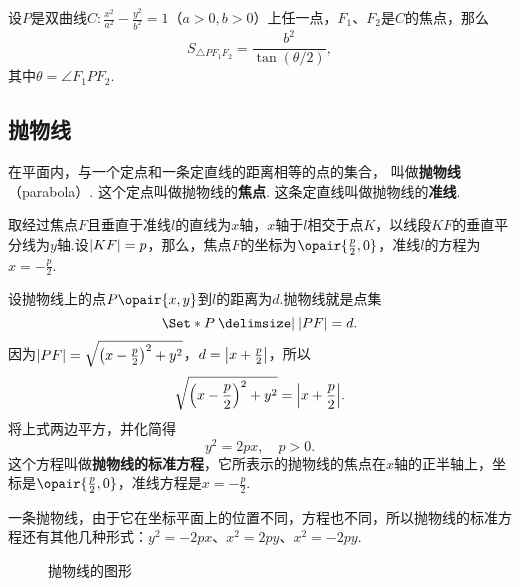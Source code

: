 \begin{theorem}[双曲线的焦点三角形]
设\(P\)是双曲线\(C: \frac{x^2}{a^2} - \frac{y^2}{b^2} = 1\)（\(a>0,b>0\)）上任一点，\(F_1\)、\(F_2\)是\(C\)的焦点，那么\[
S_{\triangle P F_1 F_2} = \frac{b^2}{\tan(\theta/2)},
\]其中\(\theta=\angle{F_1 P F_2}\).
\end{theorem}

\subsection{抛物线}
\begin{definition}
在平面内，与一个定点和一条定直线的距离相等的点的集合，%
叫做\textbf{抛物线}（parabola）.
这个定点叫做抛物线的\textbf{焦点}.
这条定直线叫做抛物线的\textbf{准线}.
\end{definition}

取经过焦点\(F\)且垂直于准线\(l\)的直线为\(x\)轴，\(x\)轴于\(l\)相交于点\(K\)，以线段\(KF\)的垂直平分线为\(y\)轴.设\(\abs{KF}=p\)，那么，焦点\(F\)的坐标为\(\opair{\frac{p}{2},0}\)，准线\(l\)的方程为\(x=-\frac{p}{2}\).

设抛物线上的点\(P\opair{x,y}\)到\(l\)的距离为\(d\).抛物线就是点集\[
\Set*{ P \given \abs{PF} = d }.
\]因为\(\abs{PF} = \sqrt{\left(x-\frac{p}{2}\right)^2+y^2}\)，\(d = \abs{x+\frac{p}{2}}\)，所以\[
\sqrt{\left(x-\frac{p}{2}\right)^2+y^2} = \abs{x+\frac{p}{2}}.
\]将上式两边平方，并化简得\begin{equation}
y^2 = 2px, \quad p > 0.
\end{equation}
这个方程叫做\textbf{抛物线的标准方程}，它所表示的抛物线的焦点在\(x\)轴的正半轴上，坐标是\(\opair{\frac{p}{2},0}\)，准线方程是\(x=-\frac{p}{2}\).

一条抛物线，由于它在坐标平面上的位置不同，方程也不同，所以抛物线的标准方程还有其他几种形式：\(y^2 = -2px\)、\(x^2 = 2py\)、\(x^2 = -2py\).

\begin{figure}[ht]
\centering
{}
\caption{抛物线的图形}
\label{figure:解析几何.抛物线的图形}
\end{figure}

